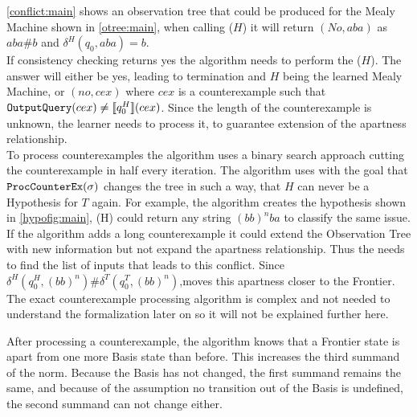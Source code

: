 \autoref{conflict:main} shows an observation tree that could be produced for the Mealy Machine shown in \autoref{otree:main}, when calling \chcons($H$) it will return $(No,aba)$ as $aba\#b$ and $\delta^H(q_0,aba)=b$. \\
If consistency checking returns yes the algorithm needs to perform the \equery($H$). The answer will either be yes, leading to termination and $H$ being the learned Mealy Machine, or $(no,cex)$ where $cex$ is a counterexample such that $\textnormal{\texttt{OutputQuery}}(cex)\neq\llbracket q_0^H\rrbracket(cex)$. 
Since the length of the counterexample is unknown, the learner needs to process it, to guarantee extension of the apartness relationship.\\
To process counterexamples the algorithm uses a binary search approach cutting the counterexample in half every iteration. The algorithm uses \proccon with the goal that $\textnormal{\texttt{ProcCounterEx}}(\sigma)$ changes the tree in such a way, that $H$ can never be a Hypothesis for $T$ again. 
For example, the algorithm creates the hypothesis shown in \autoref{hypofig:main}, \equery(H) could return any string $(bb)^nba$ to classify the same issue. If the algorithm adds a long counterexample it could extend the Observation Tree with new information but not expand the apartness relationship. Thus the \proccon needs to find the list of inputs that leads to this conflict. Since $\delta^H(q_0^H,(bb)^n)\# \delta ^T(q_0^T,(bb)^n)$,\proccon\space moves this apartness closer to the Frontier. The exact counterexample processing algorithm is complex and not needed to understand the formalization later on so it will not be explained further here. 

After processing a counterexample, the algorithm knows that a Frontier state is apart from one more Basis state than before. This increases the third summand of the norm. Because the Basis has not changed, the first summand remains the same, and because of the assumption no transition out of the Basis is undefined, the second summand can not change either.\\

